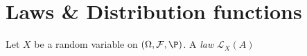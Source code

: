 \section{Laws \& Distribution functions}
\par\bigskip
\begin{defo}[Law]{}
  Let $X$ be a random variable on $(\Omega, \mathcal{F},\P)$. A \textit{law} $\mathcal{L}_X(A)$
\end{defo}
